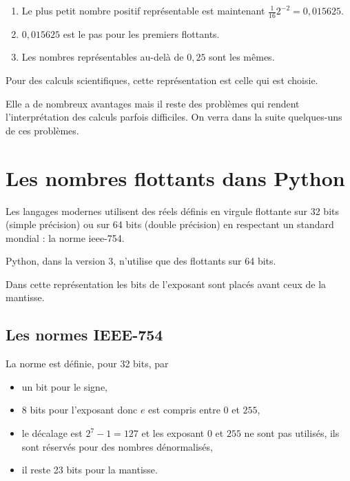 \begin{enumerate}
  \item Le plus petit nombre positif représentable est maintenant $ \frac 1{16}2^{-2} = 0,015625$.
  \item $0,015625$ est le pas pour les premiers flottants.  
  \item Les nombres représentables au-delà de $0,25$ sont les mêmes.
\end{enumerate}

Pour des calculs scientifiques, cette représentation est celle qui est choisie.

Elle a de nombreux avantages mais il reste des problèmes qui rendent l'interprétation des calculs parfois difficiles. On verra dans la suite quelques-uns de ces problèmes.
\section{Les nombres flottants dans Python}
Les langages modernes utilisent des réels définis en virgule flottante sur 32 bits (simple précision) ou sur 64 bits (double précision) en respectant un standard mondial : la norme {\sc ieee}-754.

Python, dans la version 3, n'utilise que des flottants sur 64 bits.

Dans cette représentation les bits de l'exposant sont placés avant ceux de la mantisse.
\subsection{Les normes IEEE-754}
La norme est définie, pour 32 bits, par
\begin{itemize}
\item un bit pour le signe, 
\item 8 bits pour l'exposant donc $e$ est compris entre 0 et $255$,
\item le décalage est $2^{7}-1=127$ et les exposant 0 et $255$ ne sont pas utilisés, ils sont réservés pour des nombres dénormalisés,
\item il reste 23 bits pour la mantisse.
\end{itemize}
\medskip

